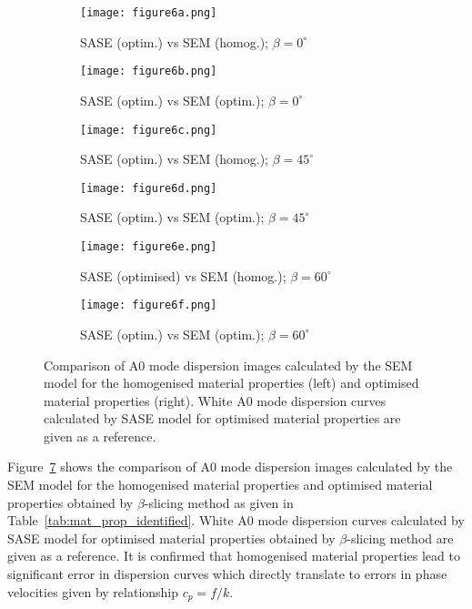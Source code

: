 \documentclass[preprint,12pt]{elsarticle}
\begin{document}
\begin{figure} [h!]
	\centering
	\begin{subfigure}[b]{0.47\textwidth}
		\centering
		\texttt{[image: figure6a.png]}
		\caption{SASE (optim.) vs SEM (homog.); $\beta=0^{\circ}$}
		\label{fig:dispersion0deg_homog_num}
	\end{subfigure}
	\hfill
	\begin{subfigure}[b]{0.47\textwidth}
		\centering
		\texttt{[image: figure6b.png]}
		\caption{SASE (optim.) vs SEM (optim.); $\beta=0^{\circ}$}
		\label{fig:dispersion0deg_opt_num}
	\end{subfigure}
	\hfill
	\begin{subfigure}[b]{0.47\textwidth}
		\centering
		\texttt{[image: figure6c.png]}
		\caption{SASE (optim.) vs SEM (homog.); $\beta=45^{\circ}$}
		\label{fig:dispersion45deg_homog_num}
	\end{subfigure}
	\hfill
	\begin{subfigure}[b]{0.47\textwidth}
		\centering
		\texttt{[image: figure6d.png]}
		\caption{SASE (optim.) vs SEM (optim.); $\beta=45^{\circ}$}
		\label{fig:dispersion45deg_opt_num}
	\end{subfigure}
	\hfill
	\begin{subfigure}[b]{0.47\textwidth}
		\centering
		\texttt{[image: figure6e.png]}
		\caption{SASE (optimised) vs SEM (homog.); $\beta=60^{\circ}$}
		\label{fig:dispersion60deg_homog_num}
	\end{subfigure}
	\hfill
	\begin{subfigure}[b]{0.47\textwidth}
		\centering
		\texttt{[image: figure6f.png]}
		\caption{SASE (optim.) vs SEM (optim.); $\beta=60^{\circ}$}
		\label{fig:dispersion60deg_opt_num}
	\end{subfigure}
	\caption{Comparison of A0 mode dispersion images calculated by the SEM model for the homogenised material properties (left) and optimised material properties (right). White A0 mode dispersion curves calculated by SASE model for optimised material properties are given as a reference. }
	\label{fig:homog_opt_num}
\end{figure}

Figure~\ref{fig:homog_opt_num} shows the comparison of A0 mode dispersion images calculated by the SEM model for the homogenised material properties and optimised material properties obtained by $\beta$-slicing method as given in Table~\ref{tab:mat_prop_identified}. 
White A0 mode dispersion curves calculated by SASE model for optimised material properties obtained by $\beta$-slicing method are given as a reference. 
It is confirmed that homogenised material properties lead to significant error in dispersion curves which directly translate to errors in phase velocities given by relationship $c_p= f/k$.
\end{document}
